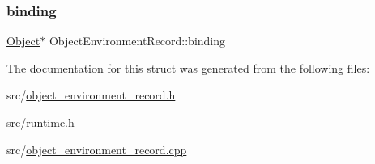 \subsubsection{\texorpdfstring{binding}{binding}}
{\footnotesize\ttfamily \hyperlink{struct_object}{Object}$\ast$ Object\+Environment\+Record\+::binding}



The documentation for this struct was generated from the following files\+:\begin{DoxyCompactItemize}
\item 
src/\hyperlink{object__environment__record_8h}{object\+\_\+environment\+\_\+record.\+h}\item 
src/\hyperlink{runtime_8h}{runtime.\+h}\item 
src/\hyperlink{object__environment__record_8cpp}{object\+\_\+environment\+\_\+record.\+cpp}\end{DoxyCompactItemize}
